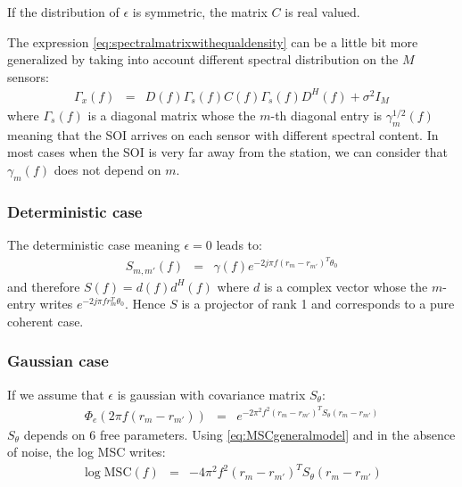 \documentclass[a4paper, 12pt]{report}
\def\MSC{\mathrm{MSC}}
\begin{document}
If the distribution of $\epsilon$ is symmetric, the matrix $C$ is real valued.


The expression \eqref{eq:spectralmatrixwithequaldensity} can be a little bit more generalized by taking into account different spectral distribution on the $M$ sensors:
\begin{eqnarray*}
 \Gamma_{x}(f)&=&D(f)\Gamma_{s}(f)C(f)\Gamma_{s}(f)D^{H}(f)+ \sigma^{2}I_M
\end{eqnarray*}
where $\Gamma_{s}(f)$ is a diagonal matrix whose the $m$-th diagonal entry is $\gamma_{m}^{1/2}(f)$ meaning that the SOI arrives on each sensor with different spectral content. In most cases when the SOI is very far away from the station, we can consider that $\gamma_{m}(f)$ does not depend on $m$.


\subsubsection{Deterministic case}
The deterministic case meaning $\epsilon=0$ leads to:
\begin{eqnarray*}
S_{m,m'}(f) &=& \gamma(f)e^{-2j\pi f (r_{m}-r_{m'})^T\theta_0}
\end{eqnarray*}
and therefore $S(f)=d(f)d^H(f)$ where $d$ is a complex vector whose the $m$-entry writes $e^{-2j\pi f r_{m}^T\theta_0}$. Hence $S$ is a projector of rank 1 and corresponds to a pure coherent case.

\subsubsection{Gaussian case}
If we assume that $\epsilon$ is gaussian with covariance matrix $S_{\theta}$:
\begin{eqnarray*}
 \Phi_{e}(2\pi f(r_{m}-r_{m'}))&=& e^{-2\pi^2f^2 (r_{m}-r_{m'})^TS_{\theta}(r_{m}-r_{m'})}
\end{eqnarray*}
$S_{\theta}$ depends on 6 free parameters. Using \eqref{eq:MSCgeneralmodel} and in the absence of noise, the log MSC writes:
\begin{eqnarray}
\label{eq:MSCgaussianwithoutnoise}
 \log \MSC(f) &=& -4\pi^2f^2 (r_{m}-r_{m'})^TS_{\theta}(r_{m}-r_{m'})
\end{eqnarray}
\end{document}
